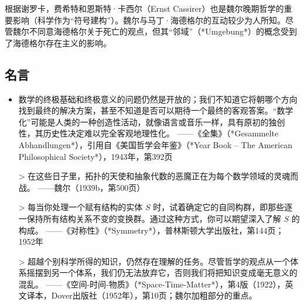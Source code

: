 根据谢罗卡，费希特和恩斯特·卡西尔（Ernst Cassirer）也是魏尔晚期哲学的重要影响（科学作为“符号建构”）。魏尔与马丁·海德格尔的互动较少为人所知。尽管魏尔不同意海德格尔关于死亡的观点，但其“邻域”（*Umgebung*）的概念受到了海德格尔存在主义的影响。
\subsection{名言}  
\begin{itemize}
\item 数学的终极基础和终极意义的问题仍然是开放的；我们不知道它将朝哪个方向找到最终的解决方案，甚至不知道是否可以期待一个最终的客观答案。“数学化”可能是人类的一种创造性活动，就像语言或音乐一样，具有原初的独创性，其历史性决定难以完全客观地理性化。  
——《全集》（*Gesammelte Abhandlungen*），引用自《美国哲学会年鉴》（*Year Book – The American Philosophical Society*），1943年，第392页  

> 在这些日子里，拓扑的天使和抽象代数的恶魔正在为每个数学领域的灵魂而战。  
——魏尔（1939b，第500页）  

> 每当你处理一个赋有结构的实体 \( S \) 时，试着确定它的自同构群，即那些逐一保持所有结构关系不变的变换群。通过这种方式，你可以期望深入了解 \( S \) 的构成。  
——《对称性》（*Symmetry*），普林斯顿大学出版社，第144页；1952年  

> 超越个别科学所得的知识，仍然存在理解的任务。尽管哲学的观点从一个体系摇摆到另一个体系，我们仍无法放弃它，否则我们将把知识变成毫无意义的混乱。  
——《空间-时间-物质》（*Space-Time-Matter*），第4版（1922），英文译本，Dover出版社（1952年），第10页；魏尔加粗部分的重点。
\end{itemize}  